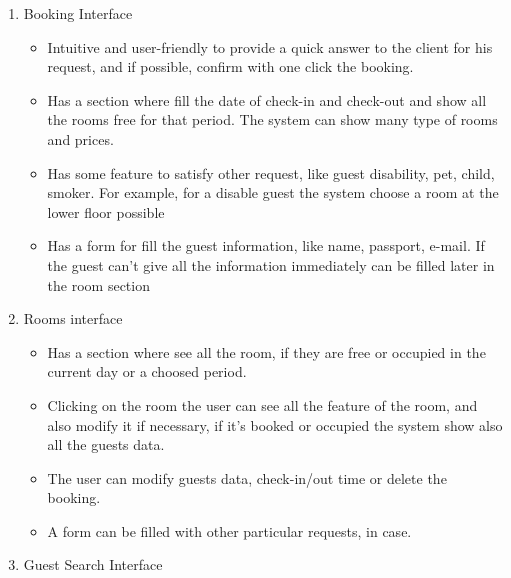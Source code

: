 \begin{enumerate}
	
\item Booking Interface
    \begin{itemize}
		\item Intuitive and user-friendly to provide a quick answer to the client for his request, and if possible, confirm with one click the booking.
		\item Has a section where fill the date of check-in and check-out and show all the rooms free for that period. The system can show many type of rooms and prices.
		\item Has some feature to satisfy other request, like guest disability, pet, child, smoker. For example, for a disable guest the system choose a room at the lower floor possible
		\item Has a form for fill the guest information, like name, passport, e-mail. If the guest can't give all the information immediately can be filled later in the room section
    \end{itemize}
	
\item Rooms interface
    \begin{itemize}
		\item Has a section where see all the room, if they are free or occupied in the current day or a choosed period.
		\item Clicking on the room the user can see all the feature of the room, and also modify it if necessary, if it's booked or occupied the system show also all the guests data.
		\item The user can modify guests data, check-in/out time or delete the booking. 
		\item A form can be filled with other particular requests, in case.
    \end{itemize}
    
\item Guest Search Interface

\end{enumerate}

